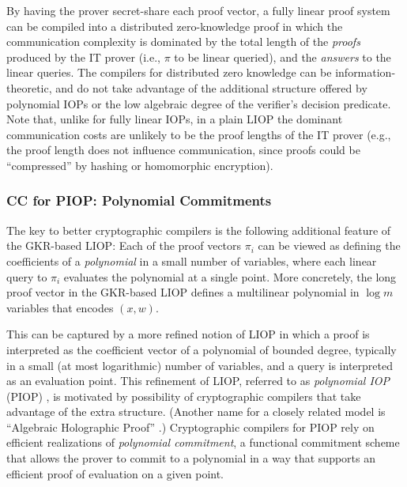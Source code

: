 By having the prover secret-share each proof vector, a fully linear proof system can be compiled \cite{2019:BBCGI:crypto:ZKPs-on-secret-shared-data-via-FLPCP} into a distributed zero-knowledge proof in which the communication complexity is dominated by the total length of the {\em proofs} produced by the IT prover (i.e., $\pi$ to be linear queried), and the {\em answers} to the linear queries.
The compilers for distributed zero knowledge can be information-theoretic, and do not take advantage of the additional structure offered by polynomial IOPs or the low algebraic degree of the verifier's decision predicate.
Note that, unlike for fully linear IOPs, in a plain LIOP the dominant communication costs are unlikely to be the proof lengths of the IT prover (e.g., the proof length does not influence communication, since proofs could be ``compressed'' by hashing or homomorphic encryption). 


\subsubsection{CC for PIOP: Polynomial Commitments}
\label{sec:CC-LIOP:Poly-IOP}

The key to better cryptographic compilers is the following additional feature of the GKR-based LIOP: Each of the proof vectors $\pi_i$ can be viewed as defining the coefficients of a {\em polynomial} in a small number of variables, where each linear query to $\pi_i$ evaluates the polynomial at a single point.
More concretely, the long proof vector in the GKR-based LIOP defines a multilinear polynomial in $\log m$ variables that encodes $(x,w)$. 

This can be captured by a more refined notion of LIOP in which a proof is interpreted as the coefficient vector of a polynomial of bounded degree, typically in a small (at most logarithmic) number of variables, and a query is interpreted as an evaluation point.
This refinement of LIOP, referred to as {\em polynomial IOP} (PIOP) \cite{2019:BFS:transparent-SNARKs-from-DARK-compilers}, is motivated by possibility of cryptographic compilers that take advantage of the extra structure. 
(Another name for a closely related model is ``Algebraic Holographic Proof'' \cite{2020:CHMMVW:Marlin}.)
Cryptographic compilers for PIOP rely on efficient realizations of {\em polynomial commitment}, a functional commitment scheme that allows the prover to commit to a polynomial in a way that supports an efficient proof of evaluation on a given point.
\loosen


